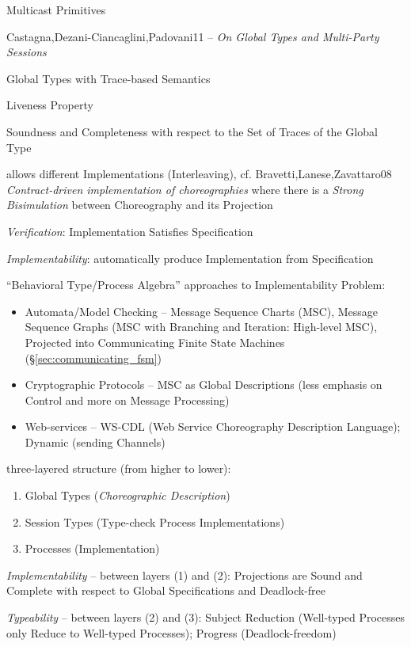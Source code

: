 Multicast Primitives


\asterism


Castagna,Dezani-Ciancaglini,Padovani11 -- \emph{On Global Types and
  Multi-Party Sessions}

Global Types with Trace-based Semantics

Liveness Property

Soundness and Completeness with respect to the Set of Traces of the
Global Type

allows different Implementations (Interleaving), cf.
Bravetti,Lanese,Zavattaro08 \emph{Contract-driven implementation of
  choreographies} where there is a \emph{Strong Bisimulation} between
Choreography and its Projection

\emph{Verification}: Implementation Satisfies Specification

\emph{Implementability}: automatically produce Implementation from
Specification

``Behavioral Type/Process Algebra'' approaches to Implementability
Problem:
\begin{itemize}
  \item Automata/Model Checking -- Message Sequence Charts (MSC),
    Message Sequence Graphs (MSC with Branching and Iteration:
    High-level MSC), Projected into Communicating Finite State
    Machines (\S\ref{sec:communicating_fsm})
  \item Cryptographic Protocols -- MSC as Global Descriptions (less
    emphasis on Control and more on Message Processing)
  \item Web-services -- WS-CDL (Web Service Choreography Description
    Language); Dynamic (sending Channels)
\end{itemize}

three-layered structure (from higher to lower):
\begin{enumerate}
  \item Global Types (\emph{Choreographic Description})
  \item Session Types (Type-check Process Implementations)
  \item Processes (Implementation)
\end{enumerate}

\emph{Implementability} -- between layers (1) and (2): Projections
are Sound and Complete with respect to Global Specifications and
Deadlock-free

\emph{Typeability} -- between layers (2) and (3): Subject Reduction
(Well-typed Processes only Reduce to Well-typed Processes); Progress
(Deadlock-freedom)


